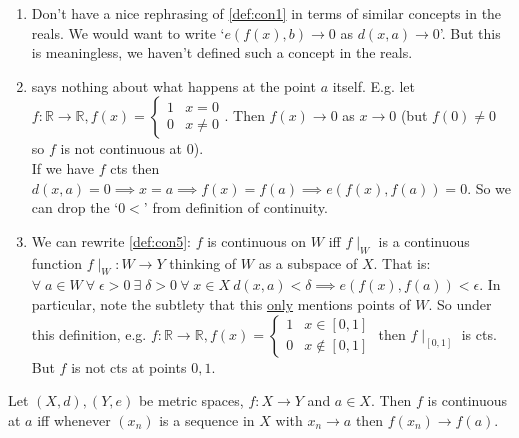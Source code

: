 
\begin{remark}
    \begin{enumerate}
        \item Don't have a nice rephrasing of \cref{def:con1} in terms of similar concepts in the reals.
        We would want to write `$e(f(x), b) \to 0$ as $d(x, a) \to 0$'.
        But this is meaningless, we haven't defined such a concept in the reals.
        \item {} says nothing about what happens at the point $a$ itself. 
        E.g. let $f : \mathbb{R} \to \mathbb{R}, f(x) = \begin{cases}
            1 & x = 0 \\
            0 & x \neq 0
        \end{cases}$.
        Then $f(x) \to 0$ as $x \to 0$ (but $f(0) \neq 0$ so $f$ is not continuous at $0$). \\
        If we have $f$ cts then $d(x, a) = 0 \implies x = a \implies f(x) = f(a) \implies e(f(x), f(a)) = 0$.
        So we can drop the `$0 <$' from definition of continuity.
        \item We can rewrite \cref{def:con5}: $f$ is continuous on $W$ iff $f\mid_W$ is a continuous function $f\mid_W : W \to Y$ thinking of $W$ as a subspace of $X$.
        That is: $\forall \; a \in W \ \forall \; \epsilon > 0 \ \exists \; \delta > 0 \ \forall \; x \in X \ d(x, a) < \delta \implies e(f(x), f(a)) < \epsilon$.
        In particular, note the subtlety that this \underline{only} mentions points of $W$.
        So under this definition, e.g. $f : \mathbb{R} \to \mathbb{R}, f(x) = \begin{cases}
            1 & x \in [0, 1] \\
            0 & x \notin [0, 1]
        \end{cases}$ then $f\mid_{[0, 1]}$ is cts.
        But $f$ is not cts at points $0, 1$.
    \end{enumerate} 
\end{remark} 

\begin{proposition} \label{prp:16}
    Let $(X, d), (Y, e)$ be metric spaces, $f : X \to Y$ and $a \in X$.
    Then $f$ is continuous at $a$ iff whenever $(x_n)$ is a sequence in $X$ with $x_n \to a$ then $f(x_n) \to f(a)$.
\end{proposition} 

